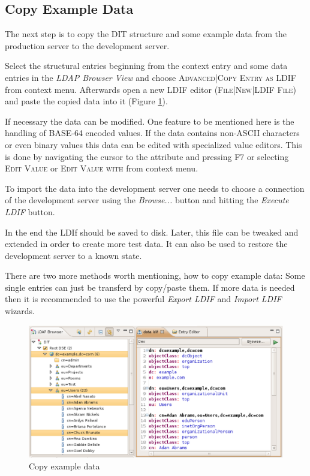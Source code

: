 \documentclass[a4paper,11pt,oneside]{article}
\begin{document}
\subsection{Copy Example Data}
The next step is to copy the DIT structure and some example data from the production server to the development server.

Select the structural entries beginning from the context entry and some data entries in the \textit{LDAP Browser View} and choose \textsc{Advanced|Copy Entry as LDIF} from context menu. Afterwards open a new LDIF editor (\textsc{File|New|LDIF File}) and paste the copied data into it (Figure \ref{Copy example data}).

If necessary the data can be modified. One feature to be mentioned here is the handling of BASE-64 encoded values. If the data contains non-ASCII characters or even binary values this data can be edited with specialized value editors. This is done by navigating the cursor to the attribute and pressing F7 or selecting \textsc{Edit Value} or \textsc{Edit Value with} from context menu.

To import the data into the development server one needs to choose a connection of the development server using the \textit{Browse...} button and hitting the \textit{Execute LDIF} button.

In the end the LDIf should be saved to disk. Later, this file can be tweaked and extended in order to create more test data. It can also be used to restore the development server to a known state.

There are two more methods worth mentioning, how to copy example data: Some single entries can just be transferd by copy/paste them. If more data is needed then it is recommended to use the powerful \textit{Export LDIF} and \textit{Import LDIF} wizards.

\begin{figure}[htb]
  \begin{center}
  \includegraphics[width=12cm]{images/05_copy_as_ldif.eps}
  \end{center}
  \caption{Copy example data}
  \label{Copy example data}
\end{figure}
\end{document}
